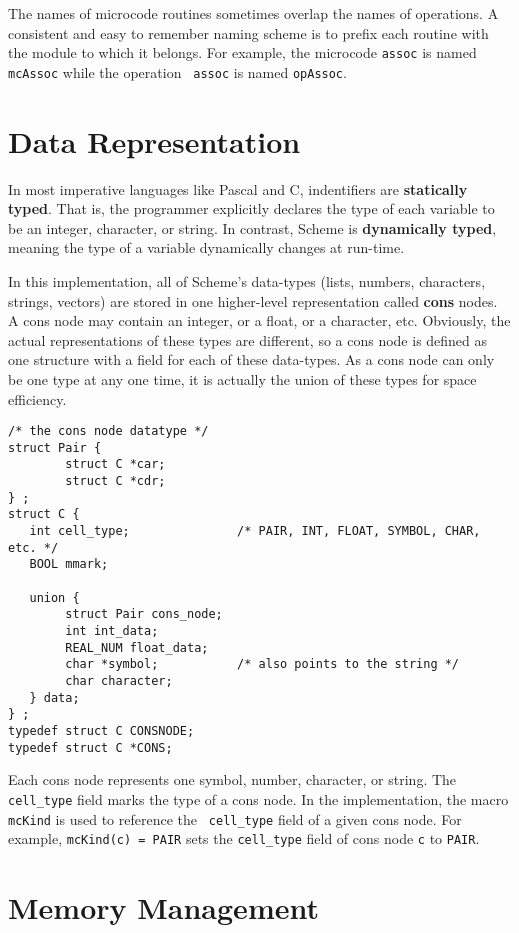 	The names of microcode routines sometimes overlap the names of
operations.  A consistent and easy to remember naming scheme is to prefix
each routine with the module to which it belongs.  For example, the
microcode {\tt assoc} is named {\tt mcAssoc} while the operation {\tt
assoc} is named {\tt opAssoc}.

\section{Data Representation}

	In most imperative languages like Pascal and C, indentifiers are
{\bf statically typed}.  That is, the programmer explicitly declares the type of
each variable to be an integer, character, or string.  In contrast, Scheme
is {\bf dynamically typed}, meaning the type of a variable dynamically changes
at run-time.

	In this implementation, all of Scheme's data-types (lists,
numbers, characters, strings, vectors) are stored in one higher-level
representation called {\bf cons} nodes.  A cons node may contain an
integer, or a float, or a character, etc.  Obviously, the actual
representations of these types are different, so a cons node is defined as
one structure with a field for each of these data-types.  As a cons node
can only be one type at any one time, it is actually the union of these
types for space efficiency.

\begin{verbatim}
/* the cons node datatype */
struct Pair {
        struct C *car;
        struct C *cdr;
} ;
struct C {
   int cell_type;               /* PAIR, INT, FLOAT, SYMBOL, CHAR, etc. */
   BOOL mmark;

   union {
        struct Pair cons_node;
        int int_data;
        REAL_NUM float_data;
        char *symbol;           /* also points to the string */
        char character;
   } data;
} ;
typedef struct C CONSNODE;
typedef struct C *CONS;
\end{verbatim}

	Each cons node represents one symbol, number, character, or
string.  The {\tt cell\_type} field marks the type of a cons node.  In the
implementation, the macro {\tt mcKind} is used to reference the {\tt
cell\_type} field of a given cons node.  For example, {\tt mcKind(c) =
PAIR} sets the {\tt cell\_type} field of cons node {\tt c} to {\tt PAIR}.

\section{Memory Management}

